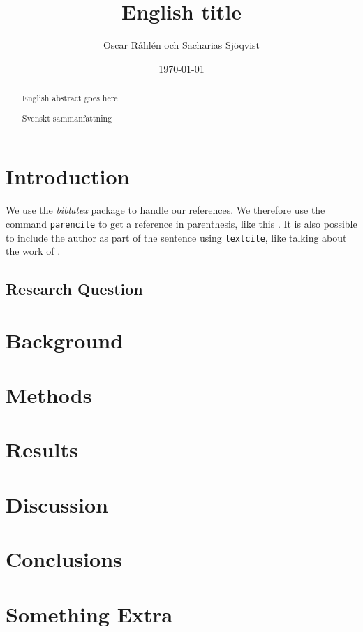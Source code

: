 \documentclass{kththesis}
\title{English title}
\author{Oscar Råhlén och Sacharias Sjöqvist}
\date{\today}
\begin{document}
\frontmatter

\titlepage

\begin{abstract}
  English abstract goes here.
\end{abstract}

\begin{otherlanguage}{swedish}
  \begin{abstract}
    Svenskt sammanfattning
  \end{abstract}
\end{otherlanguage}

\tableofcontents

\mainmatter

\chapter{Introduction}
We use the \emph{biblatex} package to handle our references.  We therefore use the
command \texttt{parencite} to get a reference in parenthesis, like this
\parencite{heisenberg2015}.  It is also possible to include the author
as part of the sentence using \texttt{textcite}, like talking about
the work of \textcite{einstein2016}.

\section{Research Question}

\chapter{Background}

\chapter{Methods}

\chapter{Results}

\chapter{Discussion}

\chapter{Conclusions}


\printbibliography[heading=bibintoc]
\appendix

\chapter{Something Extra}

\tailmatter
\end{document}
